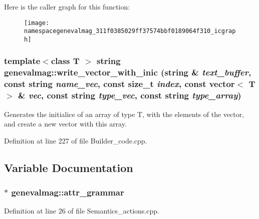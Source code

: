 Here is the caller graph for this function:\nopagebreak
\begin{figure}[H]
\begin{center}
\leavevmode
\texttt{[image: namespacegenevalmag\_311f0385029ff37574bbf0189064f310\_icgraph]}
\end{center}
\end{figure}
\hypertarget{namespacegenevalmag_f74af87309332e02ec5d55c14ab1fa97}{
\subsubsection[{write\_\-vector\_\-with\_\-inic}]{\setlength{\rightskip}{0pt plus 5cm}template$<$class T $>$ string genevalmag::write\_\-vector\_\-with\_\-inic (string \& {\em text\_\-buffer}, \/  const string {\em name\_\-vec}, \/  const size\_\-t {\em index}, \/  const vector$<$ T $>$ \& {\em vec}, \/  const string {\em type\_\-vec}, \/  const string {\em type\_\-array})}}
\label{namespacegenevalmag_f74af87309332e02ec5d55c14ab1fa97}


Generates the initialice of an array of type T, with the elements of the vector, and create a new vector with this array. 

Definition at line 227 of file Builder\_\-code.cpp.

\subsection{Variable Documentation}
\hypertarget{namespacegenevalmag_85aabf29d2f206619e2d128154283336}{
\subsubsection[{attr\_\-grammar}]{$\ast$ {\bf genevalmag::attr\_\-grammar}}}
\label{namespacegenevalmag_85aabf29d2f206619e2d128154283336}




Definition at line 26 of file Semantics\_\-actions.cpp.


